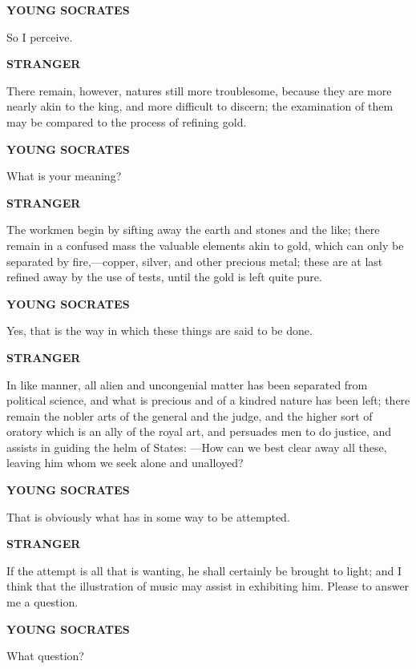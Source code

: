 \documentclass[11pt,letter]{article}
\begin{document}
\par \textbf{YOUNG SOCRATES}
\par   So I perceive.

\par \textbf{STRANGER}
\par   There remain, however, natures still more troublesome, because they are more nearly akin to the king, and more difficult to discern; the examination of them may be compared to the process of refining gold.

\par \textbf{YOUNG SOCRATES}
\par   What is your meaning?

\par \textbf{STRANGER}
\par   The workmen begin by sifting away the earth and stones and the like; there remain in a confused mass the valuable elements akin to gold, which can only be separated by fire,—copper, silver, and other precious metal; these are at last refined away by the use of tests, until the gold is left quite pure.

\par \textbf{YOUNG SOCRATES}
\par   Yes, that is the way in which these things are said to be done.

\par \textbf{STRANGER}
\par   In like manner, all alien and uncongenial matter has been separated from political science, and what is precious and of a kindred nature has been left; there remain the nobler arts of the general and the judge, and the higher sort of oratory which is an ally of the royal art, and persuades men to do justice, and assists in guiding the helm of States: —How can we best clear away all these, leaving him whom we seek alone and unalloyed?

\par \textbf{YOUNG SOCRATES}
\par   That is obviously what has in some way to be attempted.

\par \textbf{STRANGER}
\par   If the attempt is all that is wanting, he shall certainly be brought to light; and I think that the illustration of music may assist in exhibiting him. Please to answer me a question.

\par \textbf{YOUNG SOCRATES}
\par   What question?
\end{document}
